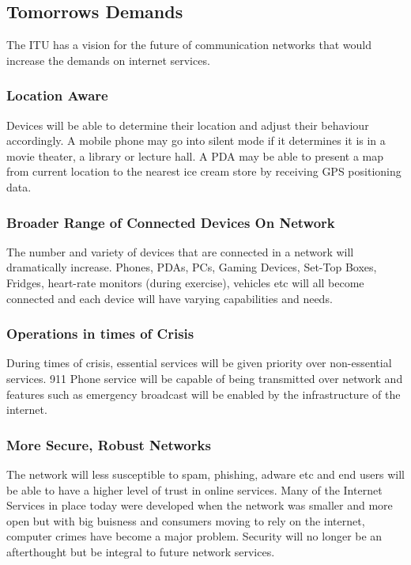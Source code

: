 \documentclass[a4paper]{article}
\begin{document}
\subsection{Tomorrows Demands}

The ITU has a vision for the future of communication networks that would increase the demands on internet services. 

\subsubsection{Location Aware}

Devices will be able to determine their location and adjust their behaviour accordingly. A mobile phone may go into silent mode if it determines it is in a movie theater, a library or lecture hall. A PDA may be able to present a map from current location to the nearest ice cream store by receiving GPS positioning data.

\subsubsection{Broader Range of Connected Devices On Network}

The number and variety of devices that are connected in a network will dramatically increase. Phones, PDAs, PCs, Gaming Devices, Set-Top Boxes, Fridges, heart-rate monitors (during exercise), vehicles etc will all become connected and each device will have varying capabilities and needs.

\subsubsection{Operations in times of Crisis}

During times of crisis, essential services will be given priority over non-essential services. 911 Phone service will be capable of being transmitted over network and features such as emergency broadcast will be enabled by the infrastructure of the internet.

\subsubsection{More Secure, Robust Networks}

The network will less susceptible to spam, phishing, adware etc and end users will be able to have a higher level of trust in online services. Many of the Internet Services in place today were developed when the network was smaller and more open but with big buisness and consumers moving to rely on the internet, computer crimes have become a major problem. Security will no longer be an afterthought but be integral to future network services.
\end{document}
